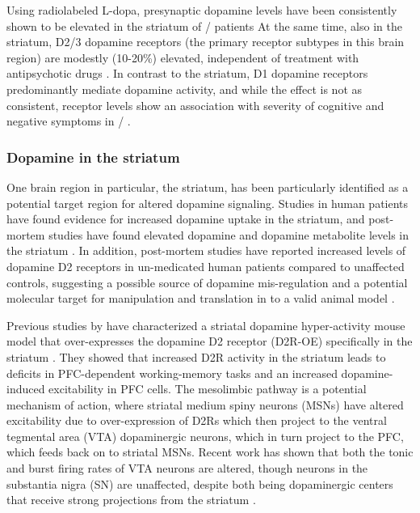 Using radiolabeled L-dopa, presynaptic dopamine levels have been consistently shown to be elevated in the striatum of \scz/ patients \citep[for review, see][]{Howes2007}
At the same time, also in the striatum, D2/3 dopamine receptors (the primary receptor subtypes in this brain region) are modestly (10-20\%) elevated, independent of treatment with antipsychotic drugs \citep[for review, see][]{Howes2009}.
In contrast to the striatum, D1 dopamine receptors predominantly mediate dopamine activity, and while the effect is not as consistent, receptor levels show an association with severity of cognitive and negative symptoms in \scz/ \citep{Goldman-Rakic2004}.

\subsubsection{Dopamine in the striatum}
One brain region in particular, the striatum, has been particularly identified as a potential target region for altered dopamine signaling. Studies in human patients have found evidence for increased dopamine uptake in the striatum, and post-mortem studies have found elevated dopamine and dopamine metabolite levels in the striatum \citep{Simpson2010}.
In addition, post-mortem studies have reported increased levels of dopamine D2 receptors in un-medicated human patients compared to unaffected controls, suggesting a possible source of dopamine mis-regulation and a potential molecular target for manipulation and translation in to a valid animal model \citep{}.

Previous studies by \citeauthor{Kellendonk2006} have characterized a striatal dopamine hyper-activity mouse model that over-expresses the dopamine D2 receptor (D2R-OE) specifically in the striatum \citep{Kellendonk2006}.
They showed that increased D2R activity in the striatum leads to deficits in \ac{PFC}-dependent working-memory tasks and an increased dopamine-induced excitability in \ac{PFC} cells.
The mesolimbic pathway is a potential mechanism of action, where striatal medium spiny neurons (MSNs) have altered excitability due to over-expression of D2Rs which then project to the ventral tegmental area (VTA) dopaminergic neurons, which in turn project to the \ac{PFC}, which feeds back on to striatal MSNs.
Recent work has shown that both the tonic and burst firing rates of VTA neurons are altered, though neurons in the substantia nigra (SN) are unaffected, despite both being dopaminergic centers that receive strong projections from the striatum \citep{Krabbe2015}.


